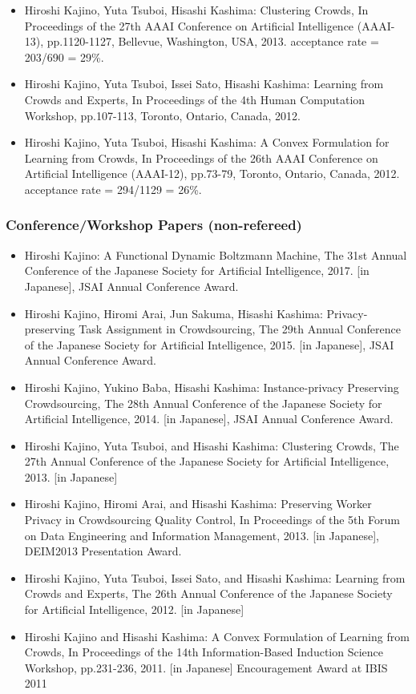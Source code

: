 \documentclass[a4paper,9pt]{article}
\begin{document}
\begin{itemize}
 \item Hiroshi Kajino, Yuta Tsuboi, Hisashi Kashima: Clustering Crowds, In Proceedings of the 27th AAAI Conference on Artificial Intelligence (AAAI-13), pp.1120-1127, Bellevue, Washington, USA, 2013. acceptance rate = 203/690 = 29\%.
 \item Hiroshi Kajino, Yuta Tsuboi, Issei Sato, Hisashi Kashima: Learning from Crowds and Experts, In Proceedings of the 4th Human Computation Workshop, pp.107-113, Toronto, Ontario, Canada, 2012.
 \item Hiroshi Kajino, Yuta Tsuboi, Hisashi Kashima: A Convex Formulation for Learning from Crowds, In Proceedings of the 26th AAAI Conference on Artificial Intelligence (AAAI-12), pp.73-79, Toronto, Ontario, Canada, 2012. acceptance rate = 294/1129 = 26\%.
\end{itemize}

\subsubsection*{Conference/Workshop Papers (non-refereed)}
\begin{itemize}
 \item Hiroshi Kajino: A Functional Dynamic Boltzmann Machine, The 31st Annual Conference of the Japanese Society for Artificial Intelligence, 2017. [in Japanese], JSAI Annual Conference Award.
 \item Hiroshi Kajino, Hiromi Arai, Jun Sakuma, Hisashi Kashima: Privacy-preserving Task Assignment in Crowdsourcing, The 29th Annual Conference of the Japanese Society for Artificial Intelligence, 2015. [in Japanese], JSAI Annual Conference Award.
 \item Hiroshi Kajino, Yukino Baba, Hisashi Kashima: Instance-privacy Preserving Crowdsourcing, The 28th Annual Conference of the Japanese Society for Artificial Intelligence, 2014. [in Japanese], JSAI Annual Conference Award.
 \item Hiroshi Kajino, Yuta Tsuboi, and Hisashi Kashima: Clustering Crowds, The 27th Annual Conference of the Japanese Society for Artificial Intelligence, 2013. [in Japanese]
 \item Hiroshi Kajino, Hiromi Arai, and Hisashi Kashima: Preserving Worker Privacy in Crowdsourcing Quality Control, In Proceedings of the 5th Forum on Data Engineering and Information Management, 2013. [in Japanese], DEIM2013 Presentation Award.
 \item Hiroshi Kajino, Yuta Tsuboi, Issei Sato, and Hisashi Kashima: Learning from Crowds and Experts, The 26th Annual Conference of the Japanese Society for Artificial Intelligence, 2012. [in Japanese]
 \item Hiroshi Kajino and Hisashi Kashima: A Convex Formulation of Learning from Crowds, In Proceedings of the 14th Information-Based Induction Science Workshop, pp.231-236, 2011. [in Japanese] Encouragement Award at IBIS 2011
\end{itemize}
\fi
\end{document}
